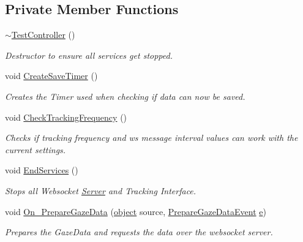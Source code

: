 \subsection*{Private Member Functions}
\begin{DoxyCompactItemize}
\item 
\hyperlink{class_web_analyzer_1_1_controller_1_1_test_controller_a9404350d73eb0d40751b1bdee5171b71}{$\sim$\+Test\+Controller} ()
\begin{DoxyCompactList}\small\item\em Destructor to ensure all services get stopped. \end{DoxyCompactList}\item 
void \hyperlink{class_web_analyzer_1_1_controller_1_1_test_controller_a448797a07babe883ab8d8e646272a6eb}{Create\+Save\+Timer} ()
\begin{DoxyCompactList}\small\item\em Creates the Timer used when checking if data can now be saved. \end{DoxyCompactList}\item 
void \hyperlink{class_web_analyzer_1_1_controller_1_1_test_controller_ae6675c76b8af44f6c0ac8c9e9d2ee628}{Check\+Tracking\+Frequency} ()
\begin{DoxyCompactList}\small\item\em Checks if tracking frequency and ws message interval values can work with the current settings. \end{DoxyCompactList}\item 
void \hyperlink{class_web_analyzer_1_1_controller_1_1_test_controller_af7260e39f8963732f38631dd618da497}{End\+Services} ()
\begin{DoxyCompactList}\small\item\em Stops all Websocket \hyperlink{namespace_web_analyzer_1_1_server}{Server} and Tracking Interface. \end{DoxyCompactList}\item 
void \hyperlink{class_web_analyzer_1_1_controller_1_1_test_controller_a61584d87704fffabf4ff0f8c04b33407}{On\+\_\+\+Prepare\+Gaze\+Data} (\hyperlink{_u_i_2_h_t_m_l_resources_2js_2lib_2underscore_8min_8js_aae18b7515bb2bc4137586506e7c0c903}{object} source, \hyperlink{class_web_analyzer_1_1_events_1_1_prepare_gaze_data_event}{Prepare\+Gaze\+Data\+Event} \hyperlink{_u_i_2_h_t_m_l_resources_2js_2lib_2bootstrap_8min_8js_ab5902775854a8b8440bcd25e0fe1c120}{e})
\begin{DoxyCompactList}\small\item\em Prepares the Gaze\+Data and requests the data over the websocket server. \end{DoxyCompactList}\end{DoxyCompactItemize}
